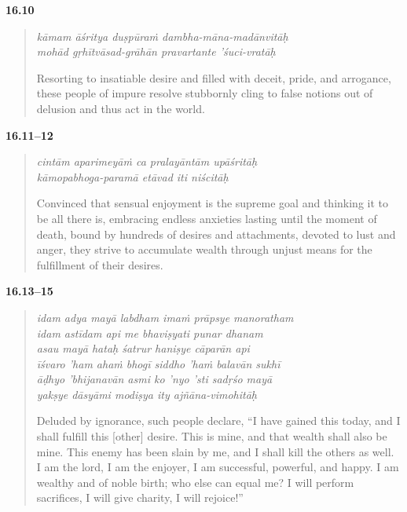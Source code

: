 \par\noindent\textbf{16.10}\par
\begin{verse}
\textit{kāmam āśritya duṣpūraṁ dambha-māna-madānvitāḥ} \\
\textit{mohād gṛhītvāsad-grāhān pravartante ’śuci-vratāḥ}

\noindent Resorting to insatiable desire and filled with deceit, pride, and arrogance, these people of impure resolve stubbornly cling to false notions out of delusion and thus act in the world.
\end{verse}
\par



\par\noindent\textbf{16.11–12}\par
\begin{verse}
\textit{cintām aparimeyāṁ ca pralayāntām upāśritāḥ} \\
\textit{kāmopabhoga-paramā etāvad iti niścitāḥ}

\noindent Convinced that sensual enjoyment is the supreme goal and thinking it to be all there is, embracing endless anxieties lasting until the moment of death, bound by hundreds of desires and attachments, devoted to lust and anger, they strive to accumulate wealth through unjust means for the fulfillment of their desires.
\end{verse}
\par



\par\noindent\textbf{16.13–15}\par
\begin{verse}
\textit{idam adya mayā labdham imaṁ prāpsye manoratham} \\
\textit{idam astīdam api me bhaviṣyati punar dhanam} \\
\textit{asau mayā hataḥ śatrur haniṣye cāparān api} \\
\textit{īśvaro ’ham ahaṁ bhogī siddho ’haṁ balavān sukhī} \\
\textit{āḍhyo ’bhijanavān asmi ko ’nyo ’sti sadṛśo mayā} \\
\textit{yakṣye dāsyāmi modiṣya ity ajñāna-vimohitāḥ}

\noindent Deluded by ignorance, such people declare, \enquote{I have gained this today, and I shall fulfill this [other] desire. This is mine, and that wealth shall also be mine. This enemy has been slain by me, and I shall kill the others as well. I am the lord, I am the enjoyer, I am successful, powerful, and happy. I am wealthy and of noble birth; who else can equal me? I will perform sacrifices, I will give charity, I will rejoice!}
\end{verse}
\par



